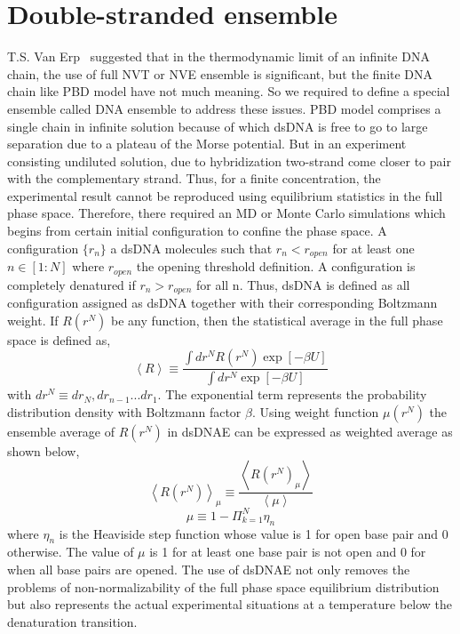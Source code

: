 \documentclass[12pt,masters,final]{UTRGVthesis}
\begin{document}
\section{Double-stranded ensemble}
{\label{dse}}
T.S. Van Erp~\cite{van2006bubbles} suggested that in the thermodynamic limit of an infinite DNA chain, the use of full NVT or NVE ensemble is significant, but the finite DNA chain like PBD model have not much meaning. So we required to define a special ensemble called DNA ensemble to address these issues. PBD model comprises a single chain in infinite solution because of which dsDNA is free to go to large separation due to a plateau of the Morse potential. But in an experiment consisting undiluted solution, due to hybridization two-strand come closer to pair with the complementary strand. Thus, for a finite concentration, the experimental result cannot be reproduced using equilibrium statistics in the full phase space. Therefore, there required an MD or Monte Carlo simulations which begins from certain initial configuration to confine the phase space. A configuration $\lbrace r_{n}\rbrace$ a dsDNA molecules such that $r_{n} < r_{open}$ for at least one $n \in \left[1:N \right]$ where $r_{open}$ the opening threshold definition. A configuration is completely denatured if $r_{n} > r_{open}$ for all n. Thus, dsDNA is defined as all configuration assigned as dsDNA together with their corresponding Boltzmann weight. If $R \left(r^N \right)$ be any function, then the statistical average in the full phase space is defined as,
% 
\begin{equation}\label{ssav}
\left< R \right> \equiv \frac{\int dr^N R \left(r^N\right) \exp{\left[  -\beta U \right] } } {\int dr^N \exp{\left[-\beta U \right]}}
\end{equation}
%
with $dr^N \equiv dr_{N}, dr_{n-1}...dr_{1}$. The exponential term represents the probability distribution density with Boltzmann factor $\beta$. Using weight function $\mu \left(r^N \right)$ the ensemble average of $R\left(r^N\right)$ in dsDNAE can be expressed as weighted average as shown below,
%
\begin{equation}
\left< R \left( r^N \right) \right>_{\mu} \equiv \frac{\left< R \left( r^N \right)_{\mu} \right>}{\left< \mu \right>}
\end{equation}
%
\begin{equation}\label{wf}
\mu\equiv 1- \Pi_{k=1}^N\eta_{n}
\end{equation}
%
where $\eta_{n}$ is the Heaviside step function whose value is 1 for open base pair and 0 otherwise. The value of $\mu$ is 1 for at least one base pair is not open and 0 for when all base pairs are opened. The use of dsDNAE not only removes the problems of non-normalizability of the full phase space equilibrium distribution but also represents the actual experimental situations at a temperature below the denaturation transition.
%
\newpage
\end{document}
